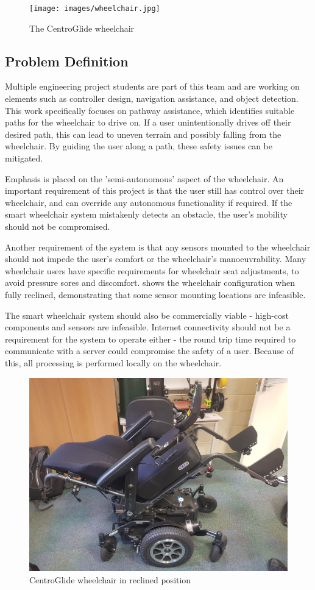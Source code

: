 \documentclass[12pt]{article}
\begin{document}
\begin{figure}[H]
    \centering
    \texttt{[image: images/wheelchair.jpg]}
    \caption{The CentroGlide wheelchair}
    \label{fig:wheelchair}
\end{figure}

\pagebreak
\subsection{Problem Definition}
Multiple engineering project students are part of this team
and are working on elements such as controller design, navigation assistance, and object detection.
This work specifically focuses on pathway assistance, which identifies suitable
paths for the wheelchair to drive on. If a user unintentionally drives off their desired path,
this can lead to uneven terrain and possibly falling from the wheelchair.
By guiding the user along a path, these safety issues can be mitigated.

Emphasis is placed on the 'semi-autonomous' aspect of the wheelchair.
An important requirement of this project is that the user still
has control over their wheelchair, and can override any autonomous functionality
if required. If the smart wheelchair system mistakenly detects an obstacle,
the user's mobility should not be compromised.

Another requirement of the system is that any sensors mounted to the wheelchair
should not impede the user's comfort or the wheelchair's manoeuvrability.
Many wheelchair users have specific requirements for wheelchair seat adjustments,
to avoid pressure sores and discomfort.  shows the
wheelchair configuration when fully reclined, demonstrating that some sensor mounting locations
are infeasible.

The smart wheelchair system should also be commercially viable - high-cost
components and sensors are infeasible. Internet connectivity should not be a requirement
for the system to operate either - the round trip time required to communicate with a server
could compromise the safety of a user. Because of this, all processing is performed locally
on the wheelchair.

\begin{figure}[H]
    \centering
    \includegraphics[width=0.4\linewidth]{images/wheelchair_reclined.jpg}
    \caption{CentroGlide wheelchair in reclined position}
    \label{fig:wheelchair_reclined}
\end{figure}
\end{document}
